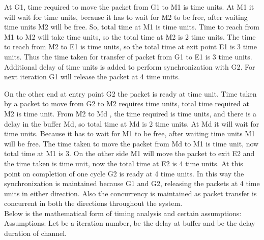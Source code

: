 \documentclass[letterpaper]{article}
\begin{document}
At G1, time required to move the packet from G1 to M1 is  time units. At M1 it will wait for  time units, because it has to wait for M2 to be free, after waiting  time units M2 will be  free. So, total time at M1 is  time units. Time to reach from M1 to M2 will take  time units, so the total time at M2 is 2 time units.  The time to reach from M2 to E1 is  time units, so the total time at exit point E1 is 3 time units. Thus the time taken for transfer of packet from G1 to E1 is 3 time units. Additional delay of  time units is added to perform synchronization with G2. For next iteration G1 will release the packet at 4 time units.
\par On the other end at entry point G2 the packet is ready at  time unit. Time taken by a packet to move from G2 to M2 requires  time units, total time required at M2 is  time unit. From M2 to Md , the time required is  time units, and there is a delay in the buffer Md, so total time at Md is 2 time units. At Md it will wait for  time units. Because it has to wait for M1 to be free, after waiting  time units M1 will be  free. The time taken to move the packet from Md to M1 is  time unit, now total time at M1 is 3. On the other side M1 will move the packet to exit E2 and the time taken is  time unit, now the total time at E2 is 4 time units. At this point on completion of one cycle G2 is ready at 4 time units. In this way the synchronization is maintained because G1 and G2, releasing the packets at 4 time units in either direction. Also the concurrency is maintained as packet transfer is concurrent in both the directions throughout the system.\\
Below is the mathematical form of timing analysis and certain assumptions:\\
Assumptions: Let  be a iteration number,  be the delay at buffer and  be the delay duration of channel. 
 
\end{document}
